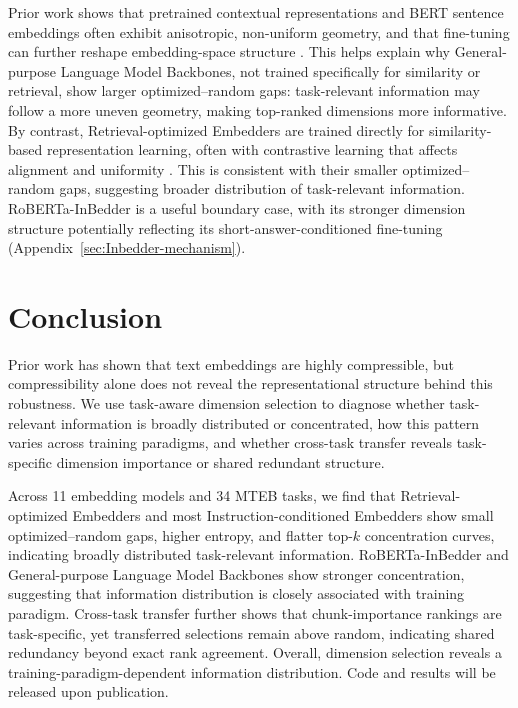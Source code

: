 \documentclass[11pt]{article}
\begin{document}
Prior work shows that pretrained contextual representations and BERT sentence embeddings often exhibit anisotropic, non-uniform geometry, and that fine-tuning can further reshape embedding-space structure \citep{ethayarajh2019representation, li2020sentence, rajaee2021fine}. This helps explain why General-purpose Language Model Backbones, not trained specifically for similarity or retrieval, show larger optimized--random gaps: task-relevant information may follow a more uneven geometry, making top-ranked dimensions more informative. By contrast, Retrieval-optimized Embedders are trained directly for similarity-based representation learning, often with contrastive learning that affects alignment and uniformity \citep{wang2020understanding, gao2021representation}. This is consistent with their smaller optimized--random gaps, suggesting broader distribution of task-relevant information. RoBERTa-InBedder is a useful boundary case, with its stronger dimension structure potentially reflecting its short-answer-conditioned fine-tuning (Appendix~\ref{sec:Inbedder-mechanism}).

\section{Conclusion}

Prior work has shown that text embeddings are highly compressible, but compressibility alone does not reveal the representational structure behind this robustness. We use task-aware dimension selection to diagnose whether task-relevant information is broadly distributed or concentrated, how this pattern varies across training paradigms, and whether cross-task transfer reveals task-specific dimension importance or shared redundant structure.

Across 11 embedding models and 34 MTEB tasks, we find that Retrieval-optimized Embedders and most Instruction-conditioned Embedders show small optimized--random gaps, higher entropy, and flatter top-$k$ concentration curves, indicating broadly distributed task-relevant information. RoBERTa-InBedder and General-purpose Language Model Backbones show stronger concentration, suggesting that information distribution is closely associated with training paradigm. Cross-task transfer further shows that chunk-importance rankings are task-specific, yet transferred selections remain above random, indicating shared redundancy beyond exact rank agreement. Overall, dimension selection reveals a training-paradigm-dependent information distribution. Code and results will be released upon publication.
\end{document}
